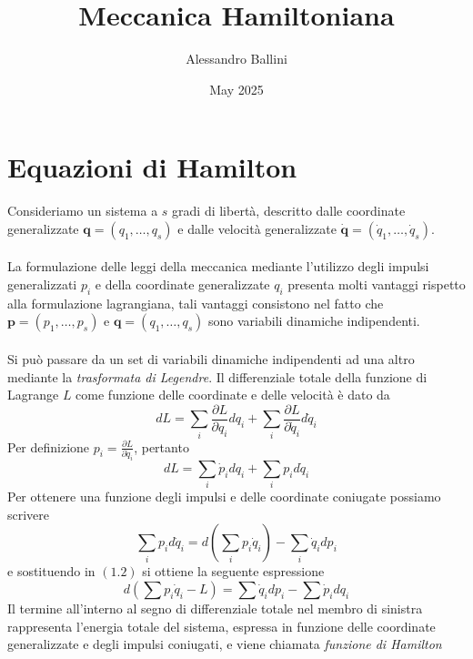 \documentclass{article}
\title{Meccanica Hamiltoniana}
\author{Alessandro Ballini}
\date{May 2025}
\begin{document}
\maketitle

\tableofcontents
\newpage


\section{Equazioni di Hamilton}
Consideriamo un sistema a $s$ gradi di libertà, descritto dalle coordinate generalizzate $\mathbf{q} = (q_1, \dots, q_s)$ e dalle velocità generalizzate $\dot{\mathbf{q}} = (\dot{q}_1, \dots, \dot{q}_s)$. \\ \\
La formulazione delle leggi della meccanica mediante l'utilizzo degli impulsi generalizzati $p_i$ e della coordinate generalizzate $q_i$ presenta molti vantaggi rispetto alla formulazione lagrangiana, tali vantaggi consistono nel fatto che $\mathbf{p} = (p_1, \dots, p_s)$ e $\mathbf{q} = (q_1, \dots, q_s)$ sono variabili dinamiche indipendenti. \\ \\
Si può passare da un set di variabili dinamiche indipendenti ad una altro mediante la \textit{trasformata di Legendre}. Il differenziale totale della funzione di Lagrange $L$ come funzione delle coordinate e delle velocità è dato da
\begin{equation}
    dL = \sum _i \frac{\partial L}{\partial q_i}dq_i + \sum_i \frac{\partial L}{\partial \dot{q}_i}d\dot{q}_i \tag{1.1}
\end{equation}
Per definizione $p_i = \frac{\partial L}{\partial \dot{q}_i}$, pertanto
\begin{equation}
    dL = \sum _i \dot{p}_idq_i + \sum_i p_id\dot{q}_i \tag{1.2}
\end{equation}
Per ottenere una funzione degli impulsi e delle coordinate coniugate possiamo scrivere
\begin{equation}
    \sum_i p_id\dot{q}_i = d\left( \sum_i p_i\dot{q}_i\right) - \sum_i \dot{q}_idp_i \tag{1.3}
\end{equation}
e sostituendo in $(1.2)$ si ottiene la seguente espressione
\begin{equation}
    d\left( \sum p_i \dot{q}_i - L \right) = \sum \dot{q}_i dp_i - \sum \dot{p}_idq_i \tag{1.4}
\end{equation}
Il termine all'interno al segno di differenziale totale nel membro di sinistra rappresenta l'energia totale del sistema, espressa in funzione delle coordinate generalizzate e degli impulsi coniugati, e viene chiamata \textit{funzione di Hamilton}
\end{document}
